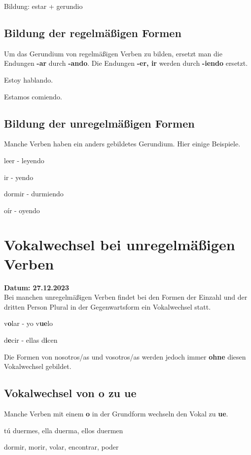 \begin{gramatica}
    \item Bildung: estar + gerundio
\end{gramatica}

\subsection*{Bildung der regelmäßigen Formen}
Um das Gerundium von regelmäßigen Verben zu bilden,
ersetzt man die Endungen \textbf{-ar} durch \textbf{-ando}.
Die Endungen \textbf{-er, ir} werden durch \textbf{-iendo} 
ersetzt.

\begin{ejemplos}
    \item Estoy hablando.
    \item Estamos comiendo.
\end{ejemplos}

\subsection*{Bildung der unregelmäßigen Formen}
Manche Verben haben ein anders gebildetes Gerundium.
Hier einige Beispiele.
\begin{ejemplos}
    \item leer - leyendo
    \item ir - yendo
    \item dormir - durmiendo
    \item oír - oyendo
\end{ejemplos}

\section{Vokalwechsel bei unregelmäßigen Verben}
\textbf{Datum: 27.12.2023}\\
Bei manchen unregelmäßigen Verben findet bei den Formen der Einzahl und der dritten
Person Plural in der Gegenwartsform ein Vokalwechsel statt.
\begin{ejemplos}
    \item v\textbf{o}lar - yo v\textbf{ue}lo
    \item d\textbf{e}cir - ellas d\textbf{i}cen
\end{ejemplos}
Die Formen von nosotros/as und vosotros/as werden jedoch immer \textbf{ohne}
diesen Vokalwechsel gebildet.
\subsection*{Vokalwechsel von o zu ue}
Manche Verben mit einem \textbf{o} in der Grundform wechseln den Vokal zu
\textbf{ue}.
\begin{ejemplos}
    \item t\'u duermes, ella duerma, ellos duermen
    \item dormir, morir, volar, encontrar, poder
\end{ejemplos}
